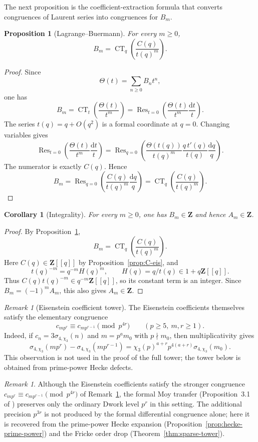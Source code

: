 \documentclass[11pt]{amsart}
\newtheorem{proposition}[theorem]{Proposition}
\newtheorem{corollary}[theorem]{Corollary}
\theoremstyle{remark}
\newtheorem{remark}[theorem]{Remark}
\DeclareMathOperator{\CT}{CT}
\DeclareMathOperator{\Res}{Res}
\newcommand{\Z}{\mathbf Z}
\newcommand{\dd}{\mathrm d}
\begin{document}
The next proposition is the coefficient-extraction formula that converts congruences of Laurent series into congruences for $B_m$.

\begin{proposition}[Lagrange--Buermann]\label{prop:LB}
For every $m\ge0$,
\[
 B_m=\CT_q\left(\frac{C(q)}{t(q)^m}\right).
\]
\end{proposition}

\begin{proof}
Since
\[
 \Theta(t)=\sum_{n\ge0}B_nt^n,
\]
one has
\[
 B_m=\CT_t\left(\frac{\Theta(t)}{t^m}\right)
 =\Res_{t=0}\left(\frac{\Theta(t)}{t^m}\frac{\dd t}{t}\right).
\]
The series $t(q)=q+O(q^2)$ is a formal coordinate at $q=0$.  Changing variables gives
\[
 \Res_{t=0}\left(\frac{\Theta(t)}{t^m}\frac{\dd t}{t}\right)
 =\Res_{q=0}\left(\frac{\Theta(t(q))}{t(q)^m}
 \frac{q\,t'(q)}{t(q)}\frac{\dd q}{q}\right).
\]
The numerator is exactly $C(q)$.  Hence
\[
 B_m=\Res_{q=0}\left(\frac{C(q)}{t(q)^m}\frac{\dd q}{q}\right)
 =\CT_q\left(\frac{C(q)}{t(q)^m}\right).
\]
\end{proof}

\begin{corollary}[Integrality]\label{cor:integrality}
For every $m\ge0$, one has $B_m\in\Z$ and hence $A_m\in\Z$.
\end{corollary}

\begin{proof}
By Proposition~\ref{prop:LB},
\[
 B_m=\CT_q\left(\frac{C(q)}{t(q)^m}\right).
\]
Here $C(q)\in\Z[[q]]$ by Proposition~\ref{prop:C-eis}, and
\[
 t(q)^{-m}=q^{-m}H(q)^m,
 \qquad
 H(q)=q/t(q)\in 1+q\Z[[q]].
\]
Thus $C(q)t(q)^{-m}\in q^{-m}\Z[[q]]$, so its constant term is an integer.
Since $B_m=(-1)^mA_m$, this also gives $A_m\in\Z$.
\end{proof}

\begin{remark}[Eisenstein coefficient tower]\label{rem:eis-tower}
The Eisenstein coefficients themselves satisfy the elementary congruence
\[
 c_{mp^r}\equiv c_{mp^{r-1}}\pmod {p^{4r}}
 \qquad(p\ge5,\ m,r\ge1).
\]
Indeed, if $c_n=3\sigma_{4,\chi_3}(n)$ and $m=p^am_0$ with $p\nmid m_0$, then multiplicativity gives
\[
 \sigma_{4,\chi_3}(mp^r)-\sigma_{4,\chi_3}(mp^{r-1})
 =\chi_3(p)^{a+r}p^{4(a+r)}\sigma_{4,\chi_3}(m_0).
\]
This observation is not used in the proof of the full tower; the tower below is obtained from prime-power Hecke defects.
\end{remark}

\begin{remark}
Although the Eisenstein coefficients satisfy the stronger congruence
$c_{mp^r}\equiv c_{mp^{r-1}}\pmod{p^{4r}}$ of Remark~\textup{\ref{rem:eis-tower}},
the formal Moy transfer (Proposition~3.1 of \cite{Moy}) preserves only the
ordinary Dwork level $p^r$ in this setting.  The additional precision $p^{3r}$
is not produced by the formal differential congruence alone; here it is
recovered from the prime-power Hecke expansion (Proposition~\ref{prop:hecke-prime-power})
and the Fricke order drop (Theorem~\ref{thm:sparse-tower}).
\end{remark}
\end{document}
